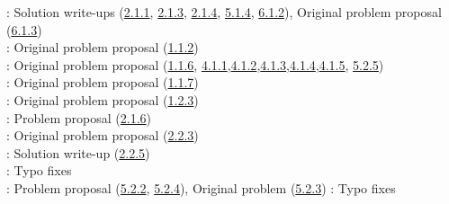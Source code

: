 \Paiya: Solution write-ups (\hyperref[2-1-1]{2.1.1}, \hyperref[2-1-3]{2.1.3}, \hyperref[2-1-4]{2.1.4}, \hyperref[5-1-4]{5.1.4}, \hyperref[6-1-2]{6.1.2}), Original problem proposal (\hyperref[6-1-3]{6.1.3}) \\
\Ptony: Original problem proposal (\hyperref[1-1-2]{1.1.2})\\
\Ppi: Original problem proposal (\hyperref[1-1-6]{1.1.6}, \hyperref[4-1-1]{4.1.1},\hyperref[4-1-2]{4.1.2},\hyperref[4-1-3]{4.1.3},\hyperref[4-1-4]{4.1.4},\hyperref[4-1-5]{4.1.5}, \hyperref[5-2-5]{5.2.5})\\
\Pbfan: Original problem proposal (\hyperref[1-1-7]{1.1.7})\\
\Pkiesh: Original problem proposal (\hyperref[1-2-3]{1.2.3})\\
\Pchris: Problem proposal (\hyperref[2-1-6]{2.1.6})\\
\Pkee: Original problem proposal (\hyperref[2-2-3]{2.2.3})\\
\PSlas: Solution write-up (\hyperref[2-2-5]{2.2.5})\\
\Parjun: Typo fixes\\
\Pnjoy: Problem proposal (\hyperref[5-2-2]{5.2.2}, \hyperref[5-2-4]{5.2.4}), Original problem (\hyperref[5-2-3]{5.2.3})
\Paops: Typo fixes\\
